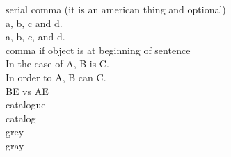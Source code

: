 serial comma (it is an american thing and optional)\\
a, b, c and d.\\
a, b, c, and d.\\

comma if object is at beginning of sentence\\
In the case of A, B is C.\\
In order to A, B can C.\\

BE vs AE\\
catalogue\\
catalog\\

grey\\
gray\\

